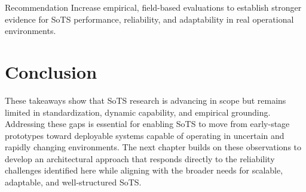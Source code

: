\begin{extrarecoframe}{Recommendation}
Increase empirical, field-based evaluations to establish stronger evidence for SoTS performance, reliability, and adaptability in real operational environments.
\end{extrarecoframe}




\section{Conclusion}
These takeaways show that SoTS research is advancing in scope but remains limited in standardization, dynamic capability, and empirical grounding. Addressing these gaps is essential for enabling SoTS to move from early-stage prototypes toward deployable systems capable of operating in uncertain and rapidly changing environments. The next chapter builds on these observations to develop an architectural approach that responds directly to the reliability challenges identified here while aligning with the broader needs for scalable, adaptable, and well-structured SoTS.
